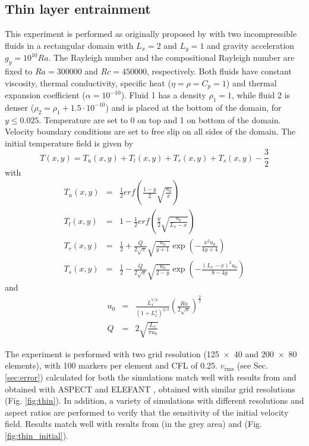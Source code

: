 \documentclass[hidelinks,10pt,a4paper]{article}
\begin{document}
\subsection{Thin layer entrainment}\label{sec:thin}
This experiment is performed as originally proposed by \citet{vanKeken1997} with two incompressible fluids in a rectangular domain with $L_x=2$ and $L_y=1$
and gravity acceleration $g_y=10^{10}Ra$. The Rayleigh number and the compositional Rayleigh number are fixed to $Ra=300000$ and $Rc=450000$, respectively.
Both fluids have constant viscosity, thermal conductivity, specific heat ($\eta=\rho=C_p=1$) and thermal expansion coefficient ($\alpha=10^{-10}$). Fluid 1
has a density $\rho_1=1$, while fluid 2 is denser ($\rho_2=\rho_1+1.5 \cdot 10^{-10}$) and is placed at the bottom of the domain, for $y \leq 0.025$.
Temperature are set to 0 on top and 1 on bottom of the domain. Velocity boundary conditions are set to free slip on all sides of the domain. The initial
temperature field is given by
\[T(x,y)=T_u(x,y)+T_l(x,y)+T_r(x,y)+T_s(x,y)-\frac{3}{2}\]
with
\begin{eqnarray}
T_u(x,y)&=&\frac{1}{2}erf\left(\frac{1-y}{2}\sqrt{\frac{u_0}{x}}\right)\nonumber \\
T_l(x,y)&=&1-\frac{1}{2}erf\left(\frac{y}{2}\sqrt{\frac{u_0}{L_x-x}}\right)\nonumber \\
T_r(x,y)&=&\frac{1}{2}+\frac{Q}{2\sqrt{\pi}}\sqrt{\frac{u_0}{y+1}} \exp\left(-\frac{x^2u_0}{4y+4}\right)\nonumber \\
T_s(x,y)&=&\frac{1}{2}-\frac{Q}{2\sqrt{\pi}}\sqrt{\frac{u_0}{2-y}} \exp\left(-\frac{(L_x-x)^2u_0}{8-4y}\right)\nonumber
\end{eqnarray}
and
\begin{eqnarray}
u_0&=&\frac{L_x^{7/3}}{(1+L_x^4)^{2/3}}\left(\frac{Ra}{2\sqrt{\pi}}\right)^{\frac{2}{3}}\nonumber \\
Q&=&2\sqrt{\frac{L_x}{\pi u_0}}\nonumber
\end{eqnarray}

The experiment is performed with two grid resolution (\num{125x40} and \num{200x80} elements), with 100 markers per element and CFL of 0.25. $v_{\textrm{rms}}$
(see Sec. \ref{sec:error}) calculated for both the simulations match well with results from \citet{vanKeken1997} and obtained with ASPECT
\citep{KHB12,heister_aspect_methods2,aspect-doi-v2.2.0,aspectmanual} and ELEFANT \citep{Thieulot2014}, obtained with similar grid resolutions
(Fig. \ref{fig:thin}). In addition, a variety of simulations with different resolutions and aspect ratios are performed to verify that the sensitivity of the
initial velocity field. Results match well with results from \citet{vanKeken1997} (in the grey area) and \citet{Thieulot2014} (Fig. \ref{fig:thin_initial}).
\end{document}
